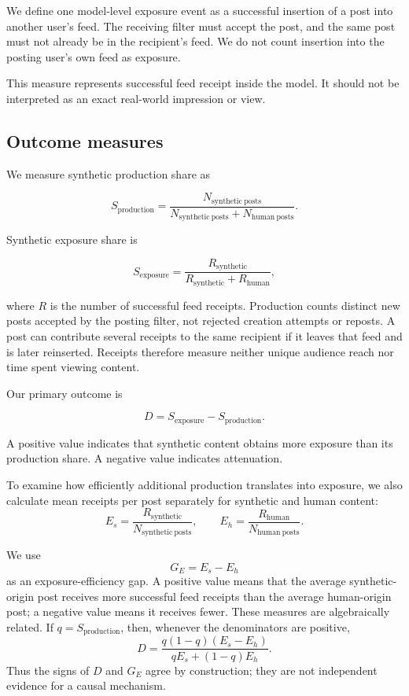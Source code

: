 \documentclass[runningheads]{llncs}
\begin{document}
We define one model-level exposure event as a successful insertion of a post into another user's feed. The receiving filter must accept the post, and the same post must not already be in the recipient's feed. We do not count insertion into the posting user's own feed as exposure.

This measure represents successful feed receipt inside the model. It should not be interpreted as an exact real-world impression or view.

\subsection{Outcome measures}
We measure synthetic production share as

\[
S_{\mathrm{production}} = \frac{N_{\mathrm{synthetic\ posts}}} {N_{\mathrm{synthetic\ posts}}+N_{\mathrm{human\ posts}}}.
\]

Synthetic exposure share is

\[
S_{\mathrm{exposure}} = \frac{R_{\mathrm{synthetic}}} {R_{\mathrm{synthetic}}+R_{\mathrm{human}}},
\]

where \(R\) is the number of successful feed receipts. Production counts distinct new posts accepted by the posting filter, not rejected creation attempts or reposts. A post can contribute several receipts to the same recipient if it leaves that feed and is later reinserted. Receipts therefore measure neither unique audience reach nor time spent viewing content.

Our primary outcome is

\[
D = S_{\mathrm{exposure}}-S_{\mathrm{production}}.
\]

A positive value indicates that synthetic content obtains more exposure than its production share. A negative value indicates attenuation.

To examine how efficiently additional production translates into exposure, we also calculate mean receipts per post separately for synthetic and human content:
\[
E_s = \frac{R_{\mathrm{synthetic}}}{N_{\mathrm{synthetic\ posts}}},
\qquad
E_h = \frac{R_{\mathrm{human}}}{N_{\mathrm{human\ posts}}}.
\]

We use
\[
G_E = E_s-E_h
\]
as an exposure-efficiency gap. A positive value means that the average synthetic-origin post receives more successful feed receipts than the average human-origin post; a negative value means it receives fewer. These measures are algebraically related. If \(q=S_{\mathrm{production}}\), then, whenever the denominators are positive,
\[
D=\frac{q(1-q)(E_s-E_h)}{qE_s+(1-q)E_h}.
\]
Thus the signs of \(D\) and \(G_E\) agree by construction; they are not independent evidence for a causal mechanism.
\end{document}
